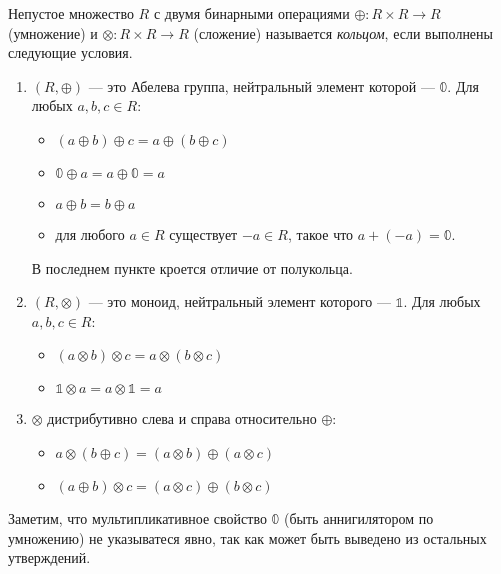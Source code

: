 \begin{definition}

Непустое множество $R$ с двумя бинарными операциями $\oplus\colon R \times R \to R$ (умножение) и $\otimes \colon R \times R \to R$ (сложение) называется \emph{кольцом}, если выполнены следующие условия.
\begin{enumerate}

\item $(R, \oplus)$ --- это Абелева группа, нейтральный элемент которой --- $\mathbb{0}$. Для любых $a,b,c \in R$:
\begin{itemize}
	\item $(a \oplus b) \oplus c = a \oplus (b \oplus c)$
	\item $\mathbb{0} \oplus a = a \oplus \mathbb{0} = a$
	\item $a \oplus b = b \oplus a$
	\item для любого $a \in R$ существует $-a \in  R$, такое что $a + (-a) = \mathbb{0}$.
\end{itemize}
В последнем пункте кроется отличие от полукольца.

\item $(R, \otimes)$ --- это моноид, нейтральный элемент которого --- $\mathbb{1}$. Для любых $a,b,c \in R$:
\begin{itemize}
	\item $(a \otimes b) \otimes c = a \otimes (b \otimes c)$
    \item $\mathbb{1} \otimes a = a \otimes \mathbb{1} = a$
\end{itemize}

\item $\otimes$ дистрибутивно слева и справа относительно $\oplus$:
\begin{itemize}
	\item $a \otimes (b \oplus c) = (a \otimes b) \oplus (a \otimes c)$
    \item $(a \oplus b) \otimes c = (a \otimes c) \oplus (b \otimes c)$
\end{itemize}

\end{enumerate}

Заметим, что мультипликативное свойство $\mathbb{0}$ (быть аннигилятором по умножению) не указыватеся явно, так как может быть выведено из остальных утверждений.

\end{definition}



